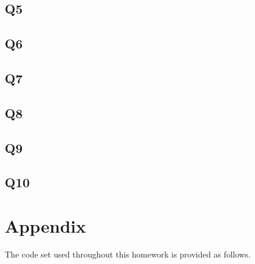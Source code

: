 \documentclass{assignment}
\begin{document}
\subsection{Q5}

\subsection{Q6}

\subsection{Q7}

\subsection{Q8}

\subsection{Q9}

\subsection{Q10}

\section*{Appendix}
The code set used throughout this homework is provided as follows. 

% 



\nocite{*} 
\end{document}
